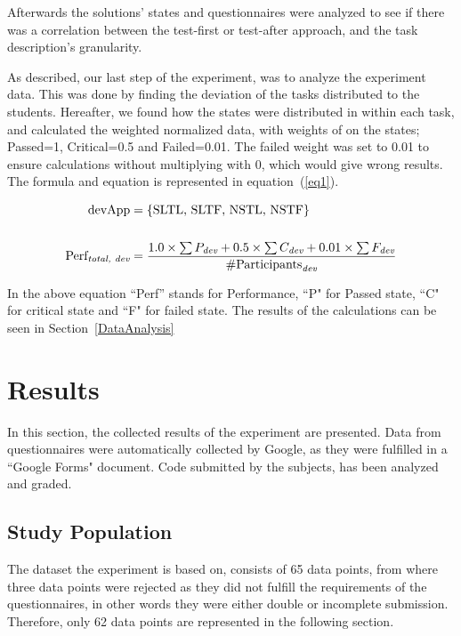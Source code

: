 \documentclass{sig-alternate-05-2015}
\begin{document}
Afterwards the solutions' states and questionnaires were analyzed to see if there was a correlation between the test-first or test-after approach, and the task description's granularity.

As described, our last step of the experiment, was to ana\-lyze the experiment data. This was done by finding the deviation of the tasks distributed to the students. Hereafter, we found how the states were distributed in within each task, and calculated the weighted normalized data, with weights of on the states; Passed=1, Critical=0.5 and Failed=0.01. The failed weight was set to 0.01 to ensure calculations without multiplying with 0, which would give wrong results.
The formula and equation is represented in equation~(\ref{eq1}).

\begin{equation}\label{eq1}
\begin{split}
\text{devApp} &= \{\text{SLTL, SLTF, NSTL, NSTF}\} \\
& \\
\text{Perf}_{\emph{total, dev}} &= \dfrac{1.0\times \sum{P_{\emph{dev}}}+0.5\times \sum {C_{\emph{dev}}}+0.01\times \sum{ F_{\emph{dev}}}}{\# \text{Participants}_{\emph{dev}}}
\end{split}
\end{equation}

In the above equation ``Perf'' stands for Performance, ``P" for Passed state, ``C" for critical state and ``F" for failed state. 
The results of the calculations can be seen in Section~\ref{DataAnalysis}

\section{Results}
\label{sec:Results}
In this section, the collected results of the experiment are presented. Data from questionnaires were automatically collected by Google, as they were fulfilled in a ``Google Forms" document. Code submitted by the subjects, has been analyzed and graded.

\subsection{Study Population}
\label{DemograpichInformation}
The dataset the experiment is based on, consists of 65 data points, from where three data points were rejected as they did not fulfill the requirements of the questionnaires, in other words they were either double or incomplete submission. Therefore, only 62 data points are represented in the following section.
\end{document}

